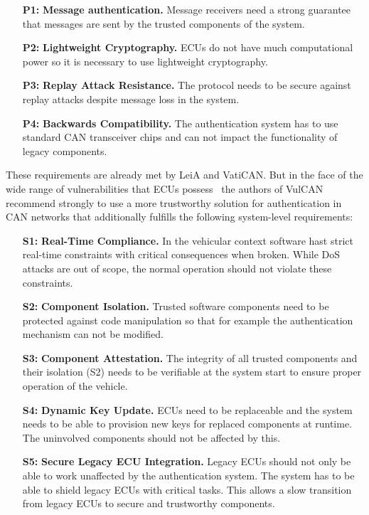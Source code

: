 \begin{enumerate}
    \item[\textbf{P1:}] \textbf{Message authentication. } Message receivers need
    a strong guarantee that messages are sent by the trusted components of the
    system.
    \item[\textbf{P2:}] \textbf{Lightweight Cryptography. } ECUs do not have
    much computational power so it is necessary to use lightweight cryptography.
    \item[\textbf{P3:}] \textbf{Replay Attack Resistance. } The protocol needs
    to be secure against replay attacks despite message loss in the system.
    \item[\textbf{P4:}] \textbf{Backwards Compatibility. } The authentication
    system has to use standard CAN transceiver chips and can not impact the
    functionality of legacy components.
\end{enumerate}

These requirements are already met by LeiA and VatiCAN\@. But in the face of the
wide range of vulnerabilities that ECUs possess~\cite{Checkoway2011,Koscher2010}
the authors of VulCAN recommend strongly to use a more trustworthy solution for
authentication in CAN networks that additionally fulfills the following
system-level requirements:


\begin{enumerate}
    \item[\textbf{S1:}] \textbf{Real-Time Compliance. } In the vehicular context
    software hast strict real-time constraints with critical consequences when
    broken. While DoS attacks are out of scope, the normal operation should not
    violate these constraints.
    \item[\textbf{S2:}] \textbf{Component Isolation. } Trusted software
    components need to be protected against code manipulation so that for
    example the authentication mechanism can not be modified.
    \item[\textbf{S3:}] \textbf{Component Attestation. } The integrity of all
    trusted components and their isolation (S2) needs to be verifiable at the
    system start to ensure proper operation of the vehicle.
    \item[\textbf{S4:}] \textbf{Dynamic Key Update. } ECUs need to be
    replaceable and the system needs to be able to provision new keys for
    replaced components at runtime. The uninvolved components should not be
    affected by this.
    \item[\textbf{S5:}] \textbf{Secure Legacy ECU Integration. } Legacy ECUs
    should not only be able to work unaffected by the authentication system. The
    system has to be able to shield legacy ECUs with critical tasks. This allows
    a slow transition from legacy ECUs to secure and trustworthy components.
\end{enumerate}

